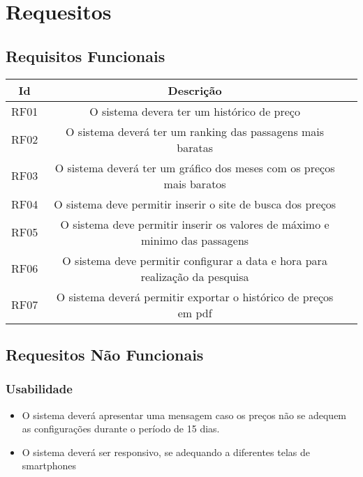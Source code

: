 \chapter[Requesitos]{Requesitos}

\section{Requisitos Funcionais}

\begin{table}[h]
	\centering
	\label{tab01}
	
	\begin{tabular}{ccc}
		\toprule
		\textbf{Id} & 
		\textbf{Descrição}\\
		\midrule
		RF01 & O sistema devera ter um histórico de preço \\
		RF02 & O sistema deverá ter um ranking das passagens mais baratas \\
		RF03 & O sistema deverá ter um gráfico dos meses com os preços mais baratos \\
		RF04 & O sistema deve permitir inserir o site de busca dos preços \\
		RF05 & O sistema deve permitir inserir os valores de máximo e minimo das passagens \\
		RF06 & O sistema deve permitir configurar a data e hora para realização da pesquisa \\
		RF07 & O sistema deverá permitir exportar o histórico de preços em pdf \\
		\bottomrule
	\end{tabular}

\end{table}


\section{Requesitos Não Funcionais}

\subsection{Usabilidade}

\begin{itemize}

	\item O sistema deverá apresentar uma mensagem caso os preços não se adequem as configurações durante o período de 15 dias.
	\item O sistema deverá ser responsivo, se adequando a diferentes telas de smartphones

\end{itemize}


